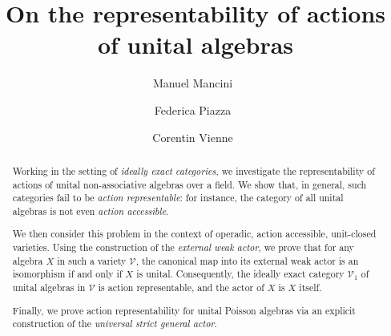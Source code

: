 \documentclass[reqno,a4paper]{amsart}
\date{}
\theoremstyle{plain}
\theoremstyle{definition}
\theoremstyle{remark}
\numberwithin{equation}{section}
\newcommand{\V}{\mathcal{V}}
\begin{document}
\title[On the representability of actions of unital algebras]{On the representability of actions\\of unital algebras}

\author[M.~Mancini]{Manuel Mancini~}
\author[F.~Piazza]{Federica Piazza~}
\author[C.~Vienne]{Corentin Vienne~}


\address[M.~Mancini]{Institut de Recherche en Mathématique et Physique, Université catholique de Louvain, chemin du cyclotron 2 bte L7.01.02, B--1348 Louvain-la-Neuve, Belgium.}
\address[M.~Mancini, F.~Piazza]{Dipartimento di Matematica e Informatica, Università degli Studi di Palermo, Via Archirafi 34, 90123 Palermo, Italy.}
\address[F.~Piazza]{Dipartimento di Scienze Matematiche e Informatiche, Scienze Fisiche e Scienze della Terra, Università degli Studi di Messina, Viale Ferdinando Stagno d'Alcontres 31, 98166 Messina, Italy.}
\address[C.~Vienne]{Dipartimento di Scienze per gli Alimenti, la Nutrizione, e l'Ambiente, Università degli Studi di Milano Statale, Via Celoria 2, 20133 Milano, Italy.}


\begin{abstract}
Working in the setting of \emph{ideally exact categories}, we investigate the representability of actions of unital non-associative algebras over a field. We show that, in general, such categories fail to be \emph{action representable}: for instance, the category of all unital algebras is not even \emph{action accessible}.

We then consider this problem in the context of operadic, action accessible, unit-closed varieties. Using the construction of the \emph{external weak actor}, we prove that for any algebra $X$ in such a variety $\V$, the canonical map into its external weak actor is an isomorphism if and only if $X$ is unital. Consequently, the ideally exact category $\V_1$ of unital algebras in $\V$ is action representable, and the actor of $X$ is $X$ itself.

Finally, we prove action representability for unital Poisson algebras via an explicit construction of the \emph{universal strict general actor}.
\end{abstract}
\end{document}
